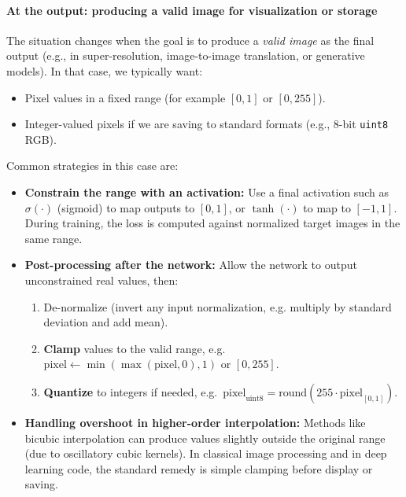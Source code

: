 \paragraph{At the output: producing a valid image for visualization or storage}
\noindent

The situation changes when the goal is to produce a \emph{valid image} as the final output (e.g., in super-resolution, image-to-image translation, or generative models). In that case, we typically want:

\begin{itemize}
	\item Pixel values in a fixed range (for example \([0,1]\) or \([0,255]\)).
	\item Integer-valued pixels if we are saving to standard formats (e.g., 8-bit \texttt{uint8} RGB).
\end{itemize}

\medskip 

Common strategies in this case are:

\begin{itemize}
	\item \textbf{Constrain the range with an activation:} Use a final activation such as \(\sigma(\cdot)\) (sigmoid) to map outputs to \([0,1]\), or \(\tanh(\cdot)\) to map to \([-1,1]\). During training, the loss is computed against normalized target images in the same range.
	\item \textbf{Post-processing after the network:} Allow the network to output unconstrained real values, then:
	\begin{enumerate}
		\item De-normalize (invert any input normalization, e.g. multiply by standard deviation and add mean).
		\item \textbf{Clamp} values to the valid range, e.g.\ \(\text{pixel} \leftarrow \min(\max(\text{pixel}, 0), 1)\) or \([0,255]\).
		\item \textbf{Quantize} to integers if needed, e.g.\ \(\text{pixel}_{\text{uint8}} = \text{round}(255 \cdot \text{pixel}_{[0,1]})\).
	\end{enumerate}
	
	\newpage
	
	\item \textbf{Handling overshoot in higher-order interpolation:} Methods like bicubic interpolation can produce values slightly outside the original range (due to oscillatory cubic kernels). In classical image processing and in deep learning code, the standard remedy is simple clamping before display or saving.
\end{itemize}

